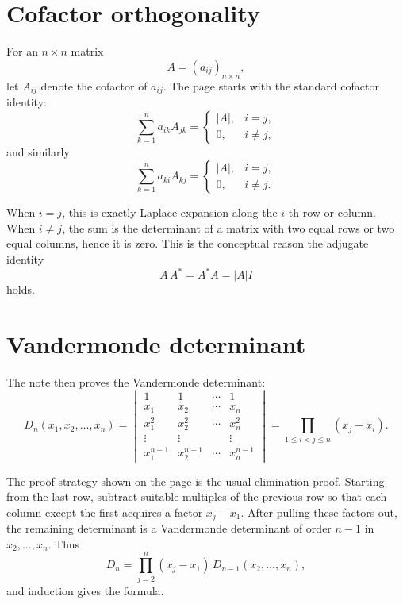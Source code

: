 


\section{Cofactor orthogonality}

For an $n\times n$ matrix
\[
  A=(a_{ij})_{n\times n},
\]
let $A_{ij}$ denote the cofactor of $a_{ij}$.  The page starts with the standard cofactor identity:
\[
  \sum_{k=1}^n a_{ik}A_{jk}
  =
  \begin{cases}
  |A|,& i=j,\\
  0,& i\ne j,
  \end{cases}
\]
and similarly
\[
  \sum_{k=1}^n a_{ki}A_{kj}
  =
  \begin{cases}
  |A|,& i=j,\\
  0,& i\ne j.
  \end{cases}
\]

When $i=j$, this is exactly Laplace expansion along the $i$-th row or column.  When $i\ne j$, the sum is the determinant of a matrix with two equal rows or two equal columns, hence it is zero.  This is the conceptual reason the adjugate identity
\[
  A\,A^*=A^*A=|A|I
\]
holds.

\section{Vandermonde determinant}

The note then proves the Vandermonde determinant:
\[
  D_n(x_1,x_2,\ldots,x_n)=
  \begin{vmatrix}
  1&1&\cdots&1\\
  x_1&x_2&\cdots&x_n\\
  x_1^2&x_2^2&\cdots&x_n^2\\
  \vdots&\vdots& &\vdots\\
  x_1^{n-1}&x_2^{n-1}&\cdots&x_n^{n-1}
  \end{vmatrix}
  =\prod_{1\le i<j\le n}(x_j-x_i).
\]

The proof strategy shown on the page is the usual elimination proof.  Starting from the last row, subtract suitable multiples of the previous row so that each column except the first acquires a factor $x_j-x_1$.  After pulling these factors out, the remaining determinant is a Vandermonde determinant of order $n-1$ in $x_2,\ldots,x_n$.  Thus
\[
  D_n=\prod_{j=2}^n(x_j-x_1)\,D_{n-1}(x_2,\ldots,x_n),
\]
and induction gives the formula.

